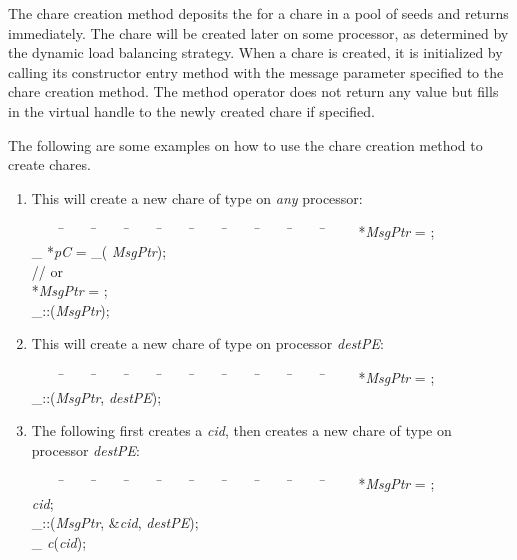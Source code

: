 The chare creation method deposits the  for
a chare in a pool of seeds and returns immediately. The chare will
be created later on some processor, as determined by the dynamic load balancing strategy. When a chare is created, it is
initialized by calling its   constructor entry method with the message parameter specified to the
chare creation method.  The method operator does not return any
value but fills in the virtual handle to the newly
created chare if specified.

The following are some examples on how to use the chare creation
method to create chares.

\begin{enumerate}
\item{This will create a new chare of type  on {\it any} processor:}
\begin{tabbing}
~~~~ \=~~~~ \=~~~~ \=~~~~ \=~~~~ \=~~~~ \=~~~~ \=~~~~ \=~~~~ \=~~~~ \kill
\>  *{\it MsgPtr} =  ; \\
\> \_ *{\it pC} =  \_({\it
MsgPtr}); \\
\> \> // or \\
\>  *{\it MsgPtr} =  ; \\
\> \_::({\it MsgPtr});
\end{tabbing} 

\item{This will create a new chare of type  on processor {\it destPE}:}
\begin{tabbing}
~~~~ \=~~~~ \=~~~~ \=~~~~ \=~~~~ \=~~~~ \=~~~~ \=~~~~ \=~~~~ \=~~~~ \kill
\>  *{\it MsgPtr} =  ; \\
\> \_::({\it MsgPtr}, {\it destPE});
\end{tabbing}

\item{The following first creates a  {\it cid},
then creates a new chare of type  on processor {\it destPE}:}

\begin{tabbing}
~~~~ \=~~~~ \=~~~~ \=~~~~ \=~~~~ \=~~~~ \=~~~~ \=~~~~ \=~~~~ \=~~~~ \kill
\>  *{\it MsgPtr} =  ; \\
\>  {\it cid}; \\
\> \_::({\it MsgPtr}, \&{\it cid}, {\it
destPE}); \\
\> \_ {\it c}({\it cid});
\end{tabbing}

\end{enumerate}

